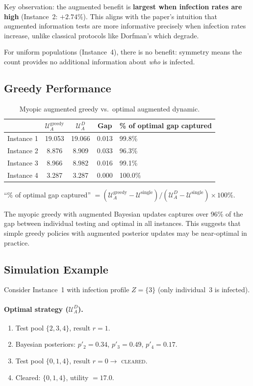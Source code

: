 \documentclass[11pt]{article}
\newcommand{\Usingle}{\mathcal{U}^{\text{single}}}
\newcommand{\UDA}{\mathcal{U}^{D}_{A}}
\newcommand{\Ugreedy}{\mathcal{U}^{\text{greedy}}_{A}}
\begin{document}
Key observation: the augmented benefit is \textbf{largest when infection rates are high}
(Instance~2: $+2.74\%$). This aligns with the paper's intuition that augmented
information tests are more informative precisely when infection rates increase,
unlike classical protocols like Dorfman's which degrade.

For uniform populations (Instance~4), there is no benefit: symmetry means the
count provides no additional information about \emph{who} is infected.


\subsection{Greedy Performance}

\begin{table}[h]
\centering
\caption{Myopic augmented greedy vs.\ optimal augmented dynamic.}
\label{tab:greedy}
\begin{tabular}{@{}lcccl@{}}
\toprule
 & $\Ugreedy$ & $\UDA$ & Gap & \% of optimal gap captured \\
\midrule
Instance 1 & 19.053 & 19.066 & 0.013 & 99.8\% \\
Instance 2 & 8.876  & 8.909  & 0.033 & 96.3\% \\
Instance 3 & 8.966  & 8.982  & 0.016 & 99.1\% \\
Instance 4 & 3.287  & 3.287  & 0.000 & 100.0\% \\
\bottomrule
\end{tabular}
\vspace{0.5em}

\footnotesize
``\% of optimal gap captured'' $= (\Ugreedy - \Usingle) / (\UDA - \Usingle) \times 100\%$.
\end{table}

The myopic greedy with augmented Bayesian updates captures over 96\% of the
gap between individual testing and optimal in all instances. This suggests
that simple greedy policies with augmented posterior updates may be
near-optimal in practice.


\subsection{Simulation Example}

Consider Instance~1 with infection profile $Z = \{3\}$ (only individual~3
is infected).

\paragraph{Optimal strategy ($\UDA$).}
\begin{enumerate}
    \item Test pool $\{2,3,4\}$, result $r = 1$.
    \item Bayesian posteriors: $p'_2 = 0.34$, $p'_3 = 0.49$, $p'_4 = 0.17$.
    \item Test pool $\{0,1,4\}$, result $r = 0 \to$ \textsc{cleared}.
    \item Cleared: $\{0, 1, 4\}$, utility $= 17.0$.
\end{enumerate}
\end{document}
